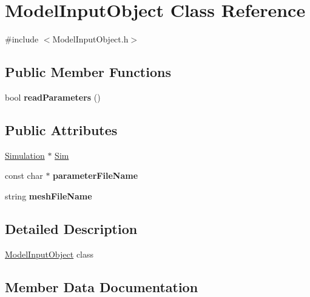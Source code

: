 \hypertarget{classModelInputObject}{}\section{Model\+Input\+Object Class Reference}
\label{classModelInputObject}


{\ttfamily \#include $<$Model\+Input\+Object.\+h$>$}

\subsection*{Public Member Functions}
\begin{DoxyCompactItemize}
\item 
\hypertarget{classModelInputObject_a9741685527f446bd2bf66455c5b01d0c}{}bool {\bfseries read\+Parameters} ()\label{classModelInputObject_a9741685527f446bd2bf66455c5b01d0c}

\end{DoxyCompactItemize}
\subsection*{Public Attributes}
\begin{DoxyCompactItemize}
\item 
\hyperlink{classSimulation}{Simulation} $\ast$ \hyperlink{classModelInputObject_a0c5fb50d9d705bc9a9b4fafeebd1cadc}{Sim}
\item 
\hypertarget{classModelInputObject_a32fadb000159d03f6c5901ce3167ada8}{}const char $\ast$ {\bfseries parameter\+File\+Name}\label{classModelInputObject_a32fadb000159d03f6c5901ce3167ada8}

\item 
\hypertarget{classModelInputObject_a2621e76abbd05573aea2d5471a589405}{}string {\bfseries mesh\+File\+Name}\label{classModelInputObject_a2621e76abbd05573aea2d5471a589405}

\end{DoxyCompactItemize}


\subsection{Detailed Description}
\hyperlink{classModelInputObject}{Model\+Input\+Object} class 

\subsection{Member Data Documentation}
\hypertarget{classModelInputObject_a0c5fb50d9d705bc9a9b4fafeebd1cadc}{}
